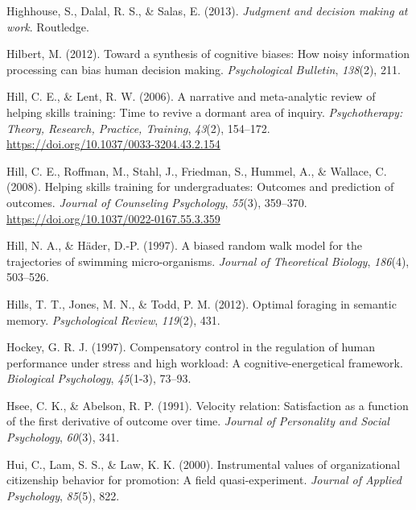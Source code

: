 \documentclass[english,,man]{apa6}
\begin{document}
\leavevmode\hypertarget{ref-highhouse_judgment_2013}{}%
Highhouse, S., Dalal, R. S., \& Salas, E. (2013). \emph{Judgment and decision making at work}. Routledge.

\leavevmode\hypertarget{ref-hilbert_toward_2012}{}%
Hilbert, M. (2012). Toward a synthesis of cognitive biases: How noisy information processing can bias human decision making. \emph{Psychological Bulletin}, \emph{138}(2), 211.

\leavevmode\hypertarget{ref-hill_narrative_2006}{}%
Hill, C. E., \& Lent, R. W. (2006). A narrative and meta-analytic review of helping skills training: Time to revive a dormant area of inquiry. \emph{Psychotherapy: Theory, Research, Practice, Training}, \emph{43}(2), 154--172. \url{https://doi.org/10.1037/0033-3204.43.2.154}

\leavevmode\hypertarget{ref-hill_helping_2008}{}%
Hill, C. E., Roffman, M., Stahl, J., Friedman, S., Hummel, A., \& Wallace, C. (2008). Helping skills training for undergraduates: Outcomes and prediction of outcomes. \emph{Journal of Counseling Psychology}, \emph{55}(3), 359--370. \url{https://doi.org/10.1037/0022-0167.55.3.359}

\leavevmode\hypertarget{ref-hill_biased_1997}{}%
Hill, N. A., \& Häder, D.-P. (1997). A biased random walk model for the trajectories of swimming micro-organisms. \emph{Journal of Theoretical Biology}, \emph{186}(4), 503--526.

\leavevmode\hypertarget{ref-hills_optimal_2012}{}%
Hills, T. T., Jones, M. N., \& Todd, P. M. (2012). Optimal foraging in semantic memory. \emph{Psychological Review}, \emph{119}(2), 431.

\leavevmode\hypertarget{ref-hockey_compensatory_1997}{}%
Hockey, G. R. J. (1997). Compensatory control in the regulation of human performance under stress and high workload: A cognitive-energetical framework. \emph{Biological Psychology}, \emph{45}(1-3), 73--93.

\leavevmode\hypertarget{ref-hsee_velocity_1991}{}%
Hsee, C. K., \& Abelson, R. P. (1991). Velocity relation: Satisfaction as a function of the first derivative of outcome over time. \emph{Journal of Personality and Social Psychology}, \emph{60}(3), 341.

\leavevmode\hypertarget{ref-hui_instrumental_2000}{}%
Hui, C., Lam, S. S., \& Law, K. K. (2000). Instrumental values of organizational citizenship behavior for promotion: A field quasi-experiment. \emph{Journal of Applied Psychology}, \emph{85}(5), 822.
\end{document}
